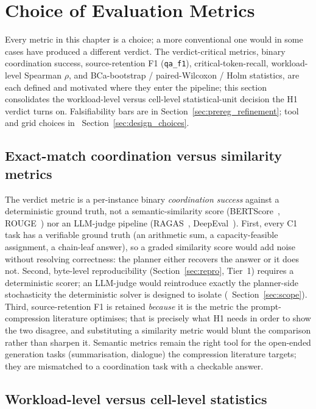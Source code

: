 \section{Choice of Evaluation Metrics}
\label{sec:metric_choices}

Every metric in this chapter is a choice; a more conventional one
would in some cases have produced a different verdict. The
verdict-critical metrics, binary coordination success,
source-retention F1 (\texttt{qa\_f1}), critical-token-recall,
workload-level Spearman $\rho$, and BCa-bootstrap / paired-Wilcoxon /
Holm statistics, are each defined and motivated where they enter
the pipeline; this section consolidates the workload-level versus
cell-level statistical-unit decision the H1 verdict turns on.
Falsifiability bars are in Section~\ref{sec:prereg_refinement}; tool
and grid choices in
~Section~\ref{sec:design_choices}.

\subsection{Exact-match coordination versus similarity metrics}
\label{sec:metric_exactmatch}

The verdict metric is a per-instance binary \emph{coordination
success} against a deterministic ground truth, not a
semantic-similarity score (BERTScore~\cite{zhang2020bertscore},
ROUGE~\cite{lin2004rouge}) nor an LLM-judge pipeline
(RAGAS~\cite{ragas2023}, DeepEval~\cite{deepeval2024}). First, every C1 task has a verifiable ground truth (an arithmetic
sum, a capacity-feasible assignment, a chain-leaf answer), so a
graded similarity score would add noise without resolving
correctness: the planner either recovers the answer or it does not.
Second, byte-level reproducibility (Section~\ref{sec:repro}, Tier~1)
requires a deterministic scorer; an LLM-judge would reintroduce
exactly the planner-side stochasticity the deterministic solver is
designed to isolate (~Section~\ref{sec:scope}).
Third, source-retention F1 is retained \emph{because} it is the metric
the prompt-compression literature optimises; that is precisely what H1
needs in order to show the two disagree, and substituting a similarity
metric would blunt the comparison rather than sharpen it. Semantic
metrics remain the right tool for the open-ended generation tasks
(summarisation, dialogue) the compression literature targets; they are
mismatched to a coordination task with a checkable answer.

\subsection{Workload-level versus cell-level statistics}
\label{sec:metric_unit}

